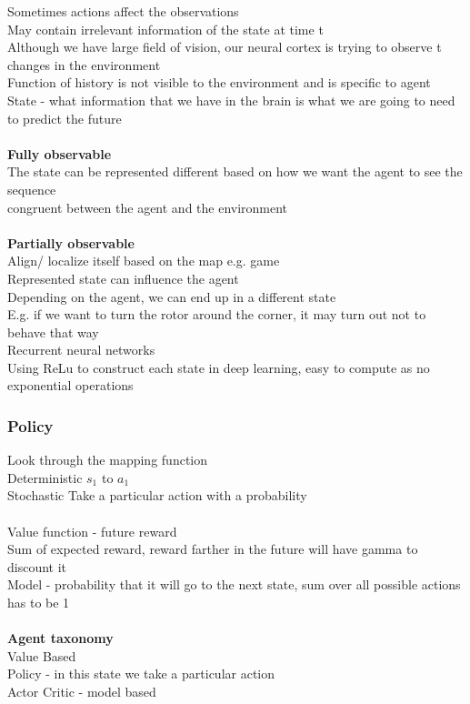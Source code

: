 \documentclass[11pt]{article}
\begin{document}
Sometimes actions affect the observations\\
May contain irrelevant information of the state at time t\\
Although we have large field of vision, our neural cortex is trying to observe t changes in the environment\\
Function of history is not visible to the environment and is specific to agent\\
State - what information that we have in the brain is what we are going to need to predict the future\\
\\
\textbf{Fully observable}\\
The state can be represented different based on how we want the agent to see the sequence\\
congruent between the agent and the environment\\
\\
\textbf{Partially observable}\\
Align/ localize itself based on the map e.g. game
\\
Represented state can influence the agent
\\
Depending on the agent, we can end up in a different state\\
E.g. if we want to turn the rotor around the corner, it may turn out not to behave that way
\\
Recurrent neural networks\\
Using ReLu to construct each state in deep learning, easy to compute as no exponential operations
\subsubsection*{Policy}
Look through the mapping function\\
Deterministic $s_{1}$ to $a_{1}$ \\
Stochastic Take a particular action with a probability\\
\\
Value function - future reward\\
Sum of expected reward, reward farther in the future will have gamma to discount it\\
Model - probability that it will go to the next state, sum over all possible actions has to be 1
\\\\
\textbf{Agent taxonomy}\\
Value Based\\
Policy - in this state we take a particular action\\
Actor Critic - model based
\\
\end{document}
